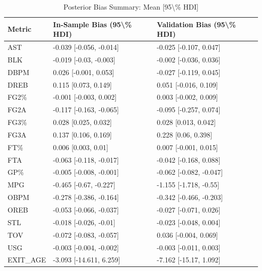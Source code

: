 \begin{table}[t]
\caption*{
{\fontsize{20}{25}\selectfont  Posterior Bias Summary: Mean [95\textbackslash{}\% HDI]\fontsize{12}{15}\selectfont }
} 
\fontsize{12.0pt}{14.0pt}\selectfont
\begin{tabular*}{\linewidth}{@{\extracolsep{\fill}}lll}
\toprule
Metric & In-Sample Bias (95\textbackslash{}\% HDI) & Validation Bias (95\textbackslash{}\% HDI) \\ 
\midrule\addlinespace[2.5pt]
AST & -0.039 [-0.056, -0.014] & -0.025 [-0.107, 0.047] \\ 
BLK & -0.019 [-0.03, -0.003] & -0.002 [-0.036, 0.036] \\ 
DBPM & 0.026 [-0.001, 0.053] & -0.027 [-0.119, 0.045] \\ 
DREB & 0.115 [0.073, 0.149] & 0.051 [-0.016, 0.109] \\ 
FG2\% & -0.001 [-0.003, 0.002] & 0.003 [-0.002, 0.009] \\ 
FG2A & -0.117 [-0.163, -0.065] & -0.095 [-0.257, 0.074] \\ 
FG3\% & 0.028 [0.025, 0.032] & 0.028 [0.013, 0.042] \\ 
FG3A & 0.137 [0.106, 0.169] & 0.228 [0.06, 0.398] \\ 
FT\% & 0.006 [0.003, 0.01] & 0.007 [-0.001, 0.015] \\ 
FTA & -0.063 [-0.118, -0.017] & -0.042 [-0.168, 0.088] \\ 
GP\% & -0.005 [-0.008, -0.001] & -0.062 [-0.082, -0.047] \\ 
MPG & -0.465 [-0.67, -0.227] & -1.155 [-1.718, -0.55] \\ 
OBPM & -0.278 [-0.386, -0.164] & -0.342 [-0.466, -0.203] \\ 
OREB & -0.053 [-0.066, -0.037] & -0.027 [-0.071, 0.026] \\ 
STL & -0.018 [-0.026, -0.01] & -0.023 [-0.048, 0.004] \\ 
TOV & -0.072 [-0.083, -0.057] & 0.036 [-0.004, 0.069] \\ 
USG & -0.003 [-0.004, -0.002] & -0.003 [-0.011, 0.003] \\ 
EXIT\_AGE & -3.093 [-14.611, 6.259] & -7.162 [-15.17, 1.092] \\ 
\bottomrule
\end{tabular*}
\end{table}

